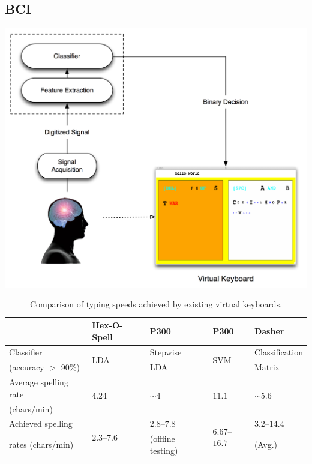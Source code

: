 \documentclass[12pt,titlepage]{article}
\begin{document}
\subsection{BCI}

\begin{center}
	\includegraphics[scale=0.40]{Figure1.jpg}
	\label{fig:BCI}
\end{center}

\begin{table}
\caption{Comparison of typing speeds achieved by existing virtual keyboards.}
\begin{center}
\begin{tabular}{lllll}
\hline\hline
& Hex-O-Spell & P300 & P300 & Dasher\\
\hline
Classifier & \multirow{2}{*}{LDA} & Stepwise & \multirow{2}{*}{SVM} & Classification \\
\quad (accuracy $>$ 90\%) & & LDA  & & Matrix \\
Average spelling rate & \multirow{2}{*}{$4.24$} & \multirow{2}{*}{$\sim4$} & \multirow{2}{*}{$11.1$} & \multirow{2}{*}{$\sim5.6$} \\
\quad (chars/min) & & & & \\
Achieved spelling & \multirow{2}{*}{$2.3$--$7.6$} & $2.8$--$7.8$ & \multirow{2}{*}{$6.67$--$16.7$} & $3.2$--$14.4$ \\
\quad rates (chars/min) & & (offline testing) & & (Avg.) \\
\hline\hline
\end{tabular}
\end{center}
\label{table:BCIComp}
\end{table}
\end{document}
